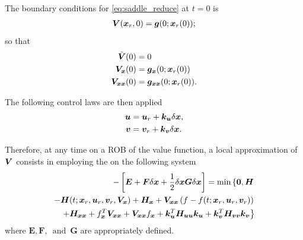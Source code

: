 The boundary conditions for \eqref{eq:saddle_reduce} at $t = 0$ is 
%
\begin{align}
	\bm{V}(\bm{x}_r, 0) = \bm{g}(0; \bm{x}_r(0));
\end{align} 
%
so that
%
\begin{subequations}
	\begin{align}
		\tilde{\bm{V}}(0) &= 0 \\
		\bm{V}_{\bm{x}}(0) &= \bm{g}_{\bm{x}} (0; \bm{x}_r(0)) \\
		\bm{V}_{\bm{x} \bm{x}} (0) &= \bm{g}_{\bm{x} \bm{x}} (0; \bm{x}_r(0)).
	\end{align}
\end{subequations}

The following control laws are then applied 
%
\begin{align}
	\bm{u} &= \bm{u}_r +  \bm{k}_{\bm{u}} \delta \bm{x}, \\
	\bm{v} &= \bm{v}_r +  \bm{k}_{\bm{v}} \delta \bm{x}.	
\end{align}

Therefore, at any time on a ROB of the value function, a local approximation of $\bm{V}$ consists in employing the  on the following system
%
\begin{align}
	\begin{split}
		-\left[\bm{E} + \bm{F} \delta \state + \dfrac{1}{2} \delta \state \bm{G} \delta \state  \right] = \min \left\{\bm{0}, \hamfunc    \right. \\ \left. %
		- \hamfunc(t; \state_r, \control_r, \disturb_r, \valuefunc_{\state})+ \hamfunc_{\state}+ \valuefunc_{\state\state} \left(f-f(t; \state_r, \control_r, \disturb_r)\right) \right. \\ \left. 
		 + \hamfunc_{\state \state} 
		+ f_{\state}^T\valuefunc_{\state\state} + \valuefunc_{\state\state} f_{\state} 	+ \gain_{\control}^T \hamfunc_{\control  \control}  \gain_{\control} +  \gain_{\disturb}^T \hamfunc_{\disturb  \disturb}  \gain_{\disturb} \right\}
	\end{split}
\end{align}
%
where $ \bm{E}, \bm{F},  \, \text{ and } \,\bm{G}$ are appropriately defined.


